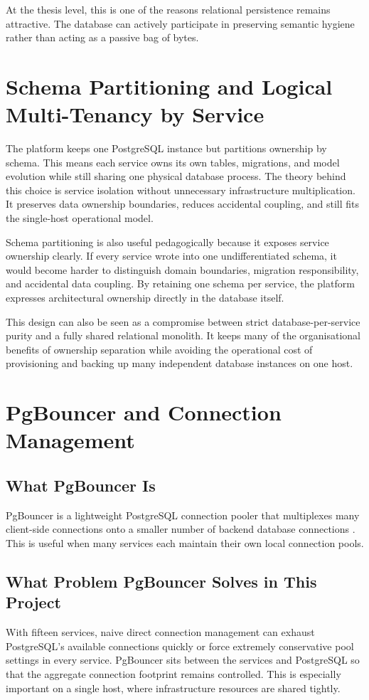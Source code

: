 At the thesis level, this is one of the reasons relational persistence remains attractive. The database can actively participate in preserving semantic hygiene rather than acting as a passive bag of bytes.

\section{Schema Partitioning and Logical Multi-Tenancy by Service}
The platform keeps one PostgreSQL instance but partitions ownership by schema. This means each service owns its own tables, migrations, and model evolution while still sharing one physical database process. The theory behind this choice is service isolation without unnecessary infrastructure multiplication. It preserves data ownership boundaries, reduces accidental coupling, and still fits the single-host operational model.

Schema partitioning is also useful pedagogically because it exposes service ownership clearly. If every service wrote into one undifferentiated schema, it would become harder to distinguish domain boundaries, migration responsibility, and accidental data coupling. By retaining one schema per service, the platform expresses architectural ownership directly in the database itself.

This design can also be seen as a compromise between strict database-per-service purity and a fully shared relational monolith. It keeps many of the organisational benefits of ownership separation while avoiding the operational cost of provisioning and backing up many independent database instances on one host.

\section{PgBouncer and Connection Management}
\subsection{What PgBouncer Is}
PgBouncer is a lightweight PostgreSQL connection pooler that multiplexes many client-side connections onto a smaller number of backend database connections \cite{pgbouncer_docs}. This is useful when many services each maintain their own local connection pools.

\subsection{What Problem PgBouncer Solves in This Project}
With fifteen services, naive direct connection management can exhaust PostgreSQL's available connections quickly or force extremely conservative pool settings in every service. PgBouncer sits between the services and PostgreSQL so that the aggregate connection footprint remains controlled. This is especially important on a single host, where infrastructure resources are shared tightly.

